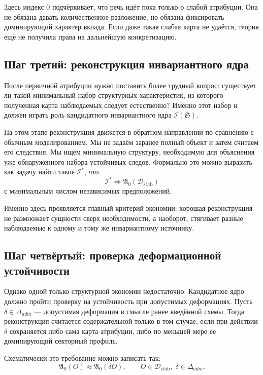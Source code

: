 \documentclass[12pt,a4paper]{article}
\begin{document}
Здесь индекс \(0\) подчёркивает, что речь идёт пока только о слабой атрибуции. Она не обязана давать количественное разложение, но обязана фиксировать доминирующий характер вклада. Если даже такая слабая карта не удаётся, теория ещё не получила права на дальнейшую конкретизацию.

\subsection{Шаг третий: реконструкция инвариантного ядра}

После первичной атрибуции нужно поставить более трудный вопрос: существует ли такой минимальный набор структурных характеристик, из которого полученная карта наблюдаемых следует естественно? Именно этот набор и должен играть роль кандидатного инвариантного ядра \(\mathcal{I}(\mathfrak{S})\).

На этом этапе реконструкция движется в обратном направлении по сравнению с обычным моделированием. Мы не задаём заранее полный объект и затем считаем его следствия. Мы ищем минимальную структуру, необходимую для объяснения уже обнаруженного набора устойчивых следов. Формально это можно выразить как задачу найти такое \(\mathcal{I}^*\), что
\begin{equation}
\mathcal{I}^* \Rightarrow \mathfrak{A}_0(\mathcal{D}_{\mathrm{stab}})
\end{equation}
с минимальным числом независимых предположений.

Именно здесь проявляется главный критерий экономии: хорошая реконструкция не размножает сущности сверх необходимости, а наоборот, стягивает разные наблюдаемые к одному и тому же инвариантному источнику.

\subsection{Шаг четвёртый: проверка деформационной устойчивости}

Однако одной только структурной экономии недостаточно. Кандидатное ядро должно пройти проверку на устойчивость при допустимых деформациях. Пусть \(\delta \in \Delta_{adm}\) --- допустимая деформация в смысле ранее введённой схемы. Тогда реконструкция считается содержательной только в том случае, если при действии \(\delta\) сохраняется либо сама карта атрибуции, либо по меньшей мере её доминирующий секторный профиль.

Схематически это требование можно записать так:
\begin{equation}
\mathfrak{A}_0(O) \approx \mathfrak{A}_0(\delta O), \qquad O \in \mathcal{D}_{\mathrm{stab}}, \; \delta \in \Delta_{adm}.
\end{equation}
\end{document}
